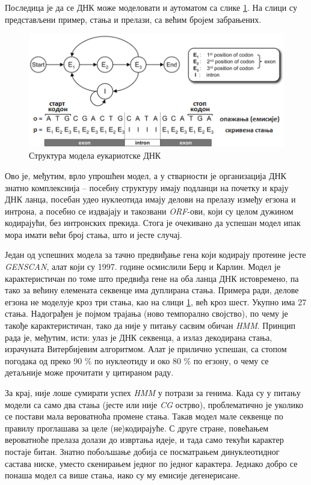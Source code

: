 \documentclass[12pt,oneside]{memoir}
\begin{document}
\begin{CJK}{UTF8}{ipxm}
Последица је да се ДНК може моделовати и аутоматом са слике \ref{fig:eukariote}. На слици су представљени пример, стања и прелази, са већим бројем забрањених.

\begin{figure}[H]
  \centering
  \includegraphics[width=.85\textwidth]{eukariote.png}
  \caption{Структура модела еукариотске ДНК\cite{eukary}}
  \label{fig:eukariote}
\end{figure}

Ово је, међутим, врло упрошћен модел, а у стварности је организација ДНК знатно комплекснија -- посебну структуру имају подланци на почетку и крају ДНК ланца, посебан удео нуклеотида имају делови на прелазу између егзона и интрона, а посебно се издвајају и такозвани \textit{ORF}-ови, који су целом дужином кодирајући, без интронских прекида\cite{henderson1997, huson2020}. Стога је очекивано да успешан модел ипак мора имати већи број стања, што и јесте случај.

Један од успешних модела за тачно предвиђање гена који кодирају протеине јесте \textit{GENSCAN}, алат који су 1997. године осмислили Берџ и Карлин\cite{genscan, burge1997}. Модел је карактеристичан по томе што предвиђа гене на оба ланца ДНК истовремено, па тако за већину елемената секвенце има дуплирана стања. Примера ради, делове егзона не моделује кроз три стања, као на слици \ref{fig:eukariote}, већ кроз шест. Укупно има 27 стања. Надограђен је појмом трајања (ново темпорално својство), по чему је такође карактеристичан, тако да није у питању сасвим обичан \textit{HMM}. Принцип рада је, међутим, исти: улаз је ДНК секвенца, а излаз декодирана стања, израчуната Витербијевим алгоритмом. Алат је прилично успешан, са стопом погодака од преко 90 \% по нуклеотиду и око 80 \% по егзону, о чему се детаљније може прочитати у цитираном раду.

За крај, није лоше сумирати успех \textit{HMM} у потрази за генима. Када су у питању модели са само два стања (јесте или није \textit{CG} острво), проблематично је уколико се постави мала вероватноћа промене стања. Такав модел мале секвенце по правилу проглашава за целе (не)кодирајуће. С друге стране, повећањем вероватноће прелаза долази до извртања идеје, и тада само текући карактер постаје битан. Знатно побољшање добија се посматрањем динуклеотидног састава ниске, уместо скенирањем једног по једног карактера. Једнако добро се понаша модел са више стања, иако су му емисије дегенерисане.


\end{CJK}
\end{document}

